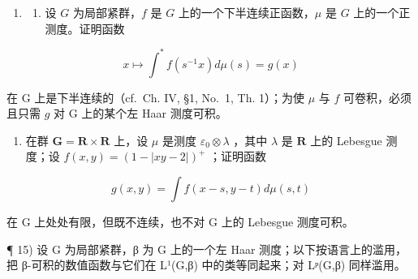 \begin{enumerate}
\def\labelenumi{\arabic{enumi})}
\setcounter{enumi}{13}
\tightlist
\item
  \begin{enumerate}
  \def\labelenumii{\alph{enumii})}
  \tightlist
  \item
    设 \(G\) 为局部紧群，\(f\) 是 \(G\) 上的一个下半连续正函数，\(\mu\) 是 \(G\) 上的一个正测度。证明函数
  \end{enumerate}
\end{enumerate}

\[
x \mapsto \int^ {*} f (s ^ {- 1} x) d \mu (s) = g (x)
\]

在 G 上是下半连续的（cf.~Ch. IV, §1, No.~1, Th. 1）；为使 \(\mu\) 与 \(f\) 可卷积，必须且只需 \(g\) 对 G 上的某个左 Haar 测度可积。

\begin{enumerate}
\def\labelenumi{\alph{enumi})}
\setcounter{enumi}{1}
\tightlist
\item
  在群 \(\mathbf{G} = \mathbf{R} \times \mathbf{R}\) 上，设 \(\mu\) 是测度 \(\varepsilon_0 \otimes \lambda\) ，其中 \(\lambda\) 是 \(\mathbf{R}\) 上的 Lebesgue 测度；设 \(f(x, y) = (1 - |xy - 2|)^+\) ；证明函数
\end{enumerate}

\[
g (x, y) = \int f (x - s, y - t) d \mu (s, t)
\]

在 G 上处处有限，但既不连续，也不对 G 上的 Lebesgue 测度可积。

¶ 15) 设 G 为局部紧群，β 为 G 上的一个左 Haar 测度；以下按语言上的滥用，把 β-可积的数值函数与它们在 L¹(G,β) 中的类等同起来；对 Lᵖ(G,β) 同样滥用。

